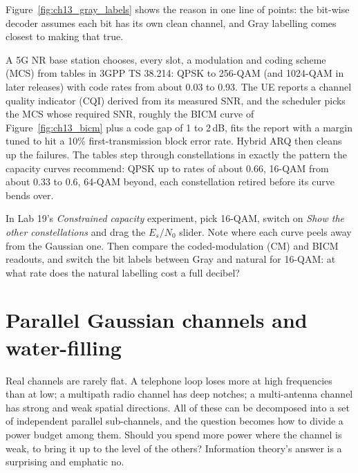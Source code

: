 
Figure~\ref{fig:ch13_gray_labels} shows the reason in one line of points: the bit-wise decoder
assumes each bit has its own clean channel, and Gray labelling comes closest to making that true.

\begin{inpractice}
A 5G NR base station chooses, every slot, a modulation and coding scheme (MCS) from tables in 3GPP
TS 38.214: QPSK to 256-QAM (and 1024-QAM in later releases) with code rates from about 0.03 to
0.93. The UE reports a channel quality indicator (CQI) derived from its measured SNR, and the
scheduler picks the MCS whose required SNR, roughly the BICM curve of
Figure~\ref{fig:ch13_bicm} plus a code gap of 1 to 2\,dB, fits the report with a margin tuned to hit
a 10\% first-transmission block error rate. Hybrid ARQ then cleans up the failures. The tables step
through constellations in exactly the pattern the capacity curves recommend: QPSK up to rates of
about 0.66, 16-QAM from about 0.33 to 0.6, 64-QAM beyond, each constellation retired before its
curve bends over.
\end{inpractice}

\begin{tryit}
In Lab 19's \emph{Constrained capacity} experiment, pick 16-QAM, switch on \emph{Show the other
constellations} and drag the $E_s/N_0$ slider. Note where each curve peels away from the Gaussian
one. Then compare the coded-modulation (CM) and BICM readouts, and switch the bit labels between
Gray and natural for 16-QAM: at what rate does the
natural labelling cost a full decibel?
\end{tryit}

\section{Parallel Gaussian channels and water-filling}
\label{sec:ch13:waterfill}

Real channels are rarely flat. A telephone loop loses more at high frequencies than at low; a
multipath radio channel has deep notches; a multi-antenna channel has strong and weak spatial
directions. All of these can be decomposed into a set of independent parallel sub-channels, and
the question becomes how to divide a power budget among them. Should you spend more power where the
channel is weak, to bring it up to the level of the others? Information theory's answer is a
surprising and emphatic no.

